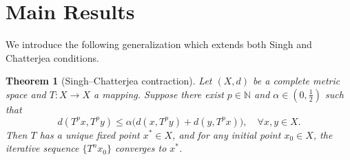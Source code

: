 \documentclass[12pt]{article}
\newtheorem{theorem}{Theorem}[section]
\begin{document}
\section{Main Results}
\label{sec:main}
We introduce the following generalization which extends both Singh and Chatterjea conditions.

\begin{theorem}[Singh--Chatterjea contraction]
Let $(X,d)$ be a complete metric space and $T:X \to X$ a mapping. Suppose there exist $p \in \mathbb{N}$ and $\alpha \in (0,\tfrac{1}{2})$ such that
\[
d(T^p x, T^p y) \leq \alpha \big( d(x, T^p y) + d(y, T^p x) \big), \quad \forall x,y \in X.
\]
Then $T$ has a unique fixed point $x^\ast \in X$, and for any initial point $x_0 \in X$, the iterative sequence $\{T^n x_0\}$ converges to $x^\ast$.
\end{theorem}
\end{document}
